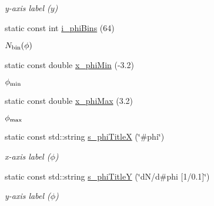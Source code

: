 \begin{CompactItemize}
\begin{CompactList}\small\item\em y-axis label ($y$) \item\end{CompactList}\item 
\hypertarget{namespaceHistGroupCfg_83b66f665ab84ae546feca8f50a15b07}{
static const int \hyperlink{namespaceHistGroupCfg_83b66f665ab84ae546feca8f50a15b07}{i\_\-phi\-Bins} (64)}
\label{namespaceHistGroupCfg_83b66f665ab84ae546feca8f50a15b07}

\begin{CompactList}\small\item\em $N_{\rm bin}(\phi)$ \item\end{CompactList}\item 
\hypertarget{namespaceHistGroupCfg_b735b15ef65ecddf28bedc169380cd5f}{
static const double \hyperlink{namespaceHistGroupCfg_b735b15ef65ecddf28bedc169380cd5f}{x\_\-phi\-Min} (-3.2)}
\label{namespaceHistGroupCfg_b735b15ef65ecddf28bedc169380cd5f}

\begin{CompactList}\small\item\em $\phi_{\rm min}$ \item\end{CompactList}\item 
\hypertarget{namespaceHistGroupCfg_d306e8d11b737f907f12293a36adb455}{
static const double \hyperlink{namespaceHistGroupCfg_d306e8d11b737f907f12293a36adb455}{x\_\-phi\-Max} (3.2)}
\label{namespaceHistGroupCfg_d306e8d11b737f907f12293a36adb455}

\begin{CompactList}\small\item\em $\phi_{\rm max}$ \item\end{CompactList}\item 
\hypertarget{namespaceHistGroupCfg_90313e17f7ecc40070d3aa31e62c942b}{
static const std::string \hyperlink{namespaceHistGroupCfg_90313e17f7ecc40070d3aa31e62c942b}{s\_\-phi\-Title\-X} (\char`\"{}\#phi\char`\"{})}
\label{namespaceHistGroupCfg_90313e17f7ecc40070d3aa31e62c942b}

\begin{CompactList}\small\item\em x-axis label ($\phi$) \item\end{CompactList}\item 
\hypertarget{namespaceHistGroupCfg_4f1880eeaaf6a9e43e5c7cf868b39096}{
static const std::string \hyperlink{namespaceHistGroupCfg_4f1880eeaaf6a9e43e5c7cf868b39096}{s\_\-phi\-Title\-Y} (\char`\"{}d\-N/d\#phi \mbox{[}1/0.1\mbox{]}\char`\"{})}
\label{namespaceHistGroupCfg_4f1880eeaaf6a9e43e5c7cf868b39096}

\begin{CompactList}\small\item\em y-axis label ($\phi$) \item\end{CompactList}\end{CompactItemize}
